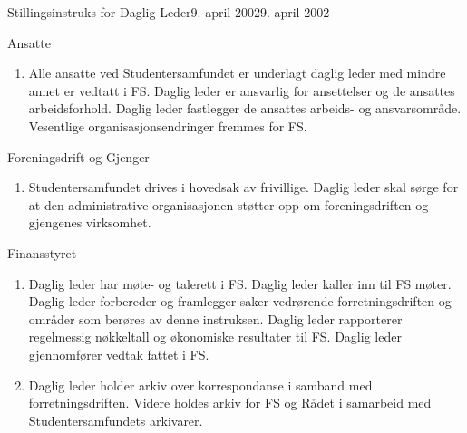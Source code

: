 \begin{instruks}{Stillingsinstruks for Daglig Leder}{9. april 2002}{9. april 2002}
    \begin{instruksledd}{Ansatte}
        \begin{enumerate}
            \item Alle ansatte ved Studentersamfundet er underlagt daglig leder med mindre annet er vedtatt 
                i FS. Daglig leder er ansvarlig for
                ansettelser og de ansattes arbeidsforhold. Daglig leder fastlegger de ansattes arbeids- og ansvarsområde. Vesentlige
                organisasjonsendringer fremmes for FS.
        \end{enumerate}
    \end{instruksledd}
\pagebreak
    \begin{instruksledd}{Foreningsdrift og Gjenger}
        \begin{enumerate}
            \item Studentersamfundet drives i hovedsak av frivillige. Daglig leder skal sørge for at den administrative organisasjonen
                støtter opp om foreningsdriften og gjengenes virksomhet.
        \end{enumerate}
    \end{instruksledd}

    \begin{instruksledd}{Finansstyret}
        \begin{enumerate}
            \item Daglig leder har møte- og talerett i FS. Daglig leder kaller inn til FS møter. Daglig leder 
                forbereder og framlegger saker vedrørende
                forretningsdriften og områder som berøres av denne instruksen. Daglig leder rapporterer regelmessig nøkkeltall og
                økonomiske resultater til FS. Daglig leder gjennomfører vedtak fattet i FS.
            \item Daglig leder holder arkiv over korrespondanse i samband med forretningsdriften. Videre holdes arkiv for FS og Rådet
                i samarbeid med Studentersamfundets arkivarer.
        \end{enumerate}
    \end{instruksledd}

\end{instruks}


